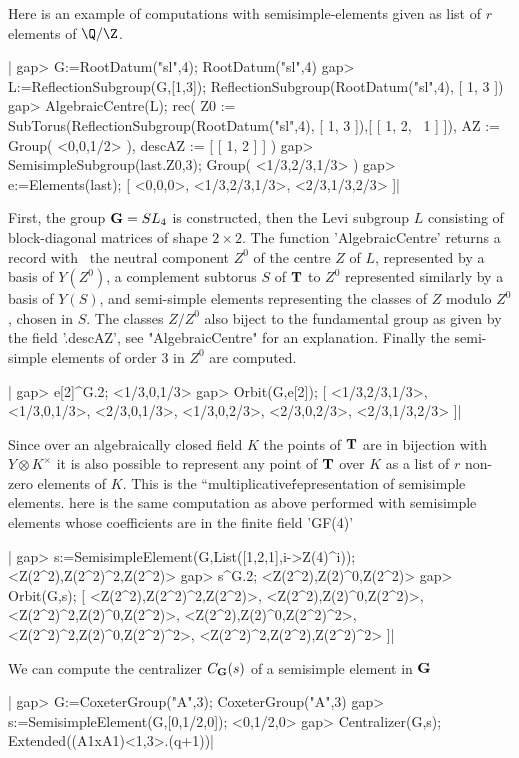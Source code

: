 Here  is an example of computations  with semisimple-elements given as list
of $r$ elements of $\Q/\Z$.

|    gap> G:=RootDatum("sl",4);
    RootDatum("sl",4)
    gap> L:=ReflectionSubgroup(G,[1,3]);
    ReflectionSubgroup(RootDatum("sl",4), [ 1, 3 ])
    gap> AlgebraicCentre(L);
    rec(
      Z0 :=
       SubTorus(ReflectionSubgroup(RootDatum("sl",4), [ 1, 3 ]),[ [ 1, 2, \
    1 ] ]),
      AZ := Group( <0,0,1/2> ),
      descAZ := [ [ 1, 2 ] ] )
    gap> SemisimpleSubgroup(last.Z0,3);
    Group( <1/3,2/3,1/3> )
    gap> e:=Elements(last);
    [ <0,0,0>, <1/3,2/3,1/3>, <2/3,1/3,2/3> ]|

First,  the group  ${\mathbf G}=SL_4$ is  constructed, then  the Levi  subgroup $L$
consisting  of block-diagonal matrices  of shape $2\times  2$. The function
'AlgebraicCentre'  returns a record with \:\ the neutral component $Z^0$ of
the  centre $Z$ of  $L$, represented by  a basis of  $Y(Z^0)$, a complement
subtorus  $S$ of ${\mathbf T}$ to $Z^0$ represented similarly by a basis of $Y(S)$,
and  semi-simple elements  representing the  classes of  $Z$ modulo $Z^0$ ,
chosen  in $S$. The classes $Z/Z^0$ also biject to the fundamental group as
given  by the  field '.descAZ',  see "AlgebraicCentre"  for an explanation.
Finally the semi-simple elements of order 3 in $Z^0$ are computed.

|    gap> e[2]^G.2;
    <1/3,0,1/3>
    gap> Orbit(G,e[2]);
    [ <1/3,2/3,1/3>, <1/3,0,1/3>, <2/3,0,1/3>, <1/3,0,2/3>, <2/3,0,2/3>,
      <2/3,1/3,2/3> ]|

Since  over an algebraically  closed field $K$  the points of  ${\mathbf T}$ are in
bijection  with $Y\otimes  K^\times$ it  is also  possible to represent any
point  of ${\mathbf T}$ over $K$ as a list of $r$ non-zero elements of $K$. This is
the ``multiplicative\'\' representation of semisimple elements. here is the
same   computation  as  above  performed  with  semisimple  elements  whose
coefficients are in the finite field 'GF(4)'\:

|    gap> s:=SemisimpleElement(G,List([1,2,1],i->Z(4)^i));
    <Z(2^2),Z(2^2)^2,Z(2^2)>
    gap> s^G.2;
    <Z(2^2),Z(2)^0,Z(2^2)>
    gap> Orbit(G,s);
    [ <Z(2^2),Z(2^2)^2,Z(2^2)>, <Z(2^2),Z(2)^0,Z(2^2)>,
      <Z(2^2)^2,Z(2)^0,Z(2^2)>, <Z(2^2),Z(2)^0,Z(2^2)^2>,
      <Z(2^2)^2,Z(2)^0,Z(2^2)^2>, <Z(2^2)^2,Z(2^2),Z(2^2)^2> ]|

We  can  compute  the  centralizer  $C_{\mathbf G}(s)$  of  a semisimple element in
${\mathbf G}$\:

|    gap> G:=CoxeterGroup("A",3);
    CoxeterGroup("A",3)
    gap> s:=SemisimpleElement(G,[0,1/2,0]);
    <0,1/2,0>
    gap> Centralizer(G,s);
    Extended((A1xA1)<1,3>.(q+1))|


